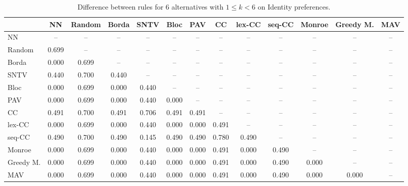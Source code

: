 
\begin{table*}[h!]
\centering
\begin{tabular}{lcccccccccccc}
\toprule
 & NN & Random & Borda & SNTV & Bloc & PAV & CC & lex-CC & seq-CC & Monroe & Greedy M. & MAV \\
\midrule
NN & -- & -- & -- & -- & -- & -- & -- & -- & -- & -- & -- & -- \\
Random & 0.699 & -- & -- & -- & -- & -- & -- & -- & -- & -- & -- & -- \\
Borda & 0.000 & 0.699 & -- & -- & -- & -- & -- & -- & -- & -- & -- & -- \\
SNTV & 0.440 & 0.700 & 0.440 & -- & -- & -- & -- & -- & -- & -- & -- & -- \\
Bloc & 0.000 & 0.699 & 0.000 & 0.440 & -- & -- & -- & -- & -- & -- & -- & -- \\
PAV & 0.000 & 0.699 & 0.000 & 0.440 & 0.000 & -- & -- & -- & -- & -- & -- & -- \\
CC & 0.491 & 0.700 & 0.491 & 0.706 & 0.491 & 0.491 & -- & -- & -- & -- & -- & -- \\
lex-CC & 0.000 & 0.699 & 0.000 & 0.440 & 0.000 & 0.000 & 0.491 & -- & -- & -- & -- & -- \\
seq-CC & 0.490 & 0.700 & 0.490 & 0.145 & 0.490 & 0.490 & 0.780 & 0.490 & -- & -- & -- & -- \\
Monroe & 0.000 & 0.699 & 0.000 & 0.440 & 0.000 & 0.000 & 0.491 & 0.000 & 0.490 & -- & -- & -- \\
Greedy M. & 0.000 & 0.699 & 0.000 & 0.440 & 0.000 & 0.000 & 0.491 & 0.000 & 0.490 & 0.000 & -- & -- \\
MAV & 0.000 & 0.699 & 0.000 & 0.440 & 0.000 & 0.000 & 0.491 & 0.000 & 0.490 & 0.000 & 0.000 & -- \\
\bottomrule
\end{tabular}

\caption{Difference between rules for 6 alternatives with $1 \leq k < 6$ on Identity preferences.}
\end{table*}
